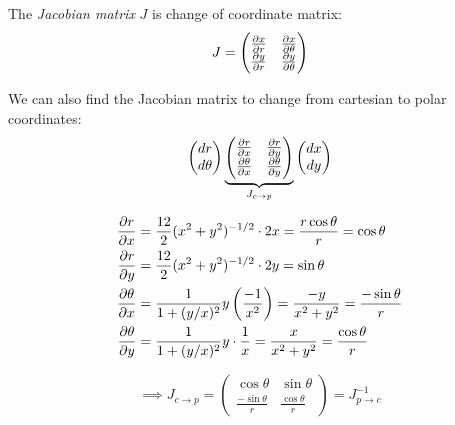 \documentclass[10pt]{scrartcl}
\begin{document}
\begin{definition}
The \emph{Jacobian matrix} $J$ is change of coordinate matrix:
\[J = \begin{pmatrix}
 \frac{\partial x}{\partial r} & \frac{\partial x}{\partial \theta}\\
 \frac{\partial y }{\partial r} & \frac{\partial y}{\partial \theta}	
 \end{pmatrix}
\]	


\end{definition}

We can also find the Jacobian matrix to change from cartesian to polar coordinates: 
\[\begin{pmatrix}
dr \\ d\theta	
\end{pmatrix}
\underbrace{\begin{pmatrix}
\frac{\partial r}{\partial x} & \frac{\partial r}{\partial y}\\
\frac{\partial \theta}{\partial x} & \frac{\partial \theta}{\partial y}	
\end{pmatrix}}_{J_{c\to p}}
\begin{pmatrix}
dx \\ dy	
\end{pmatrix}
\]

\[
\begin{aligned}
  \frac{\partial r}{\partial x} &= \frac{12}{2}(x^2 + y^2)^{-1/2}\cdot 2x = \frac{r\cos\theta}{r} =\cos\theta\\
  \frac{\partial r}{\partial y} &= \frac{12}{2}(x^2 + y^2)^{-1/2}\cdot 2y = \sin\theta\\
  \frac{\partial \theta}{\partial x} &= \frac{1}{1 + (y/x)^2}y\left(\frac{-1}{x^2}\right) = \frac{-y}{x^2 + y^2} = \frac{-\sin\theta}{r}\\
    \frac{\partial \theta}{\partial y} &= \frac{1}{1 + (y/x)^2}y\cdot\frac{1}{x} = \frac{x}{x^2 + y^2} = \frac{\cos\theta}{r}
\end{aligned}
\]

\[\implies J_{c\to p} = 
\begin{pmatrix}
\cos\theta & \sin\theta\\
\frac{-\sin\theta}{r} & \frac{\cos\theta}{r}	
\end{pmatrix}
= J^{-1}_{p \to c} 
\]
\end{document}
